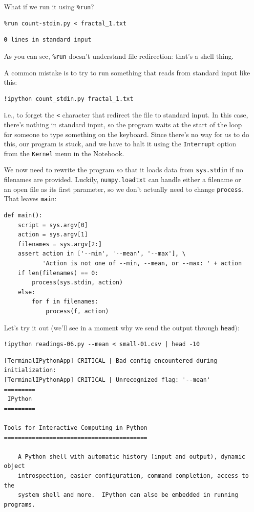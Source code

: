 \documentclass{book}
\begin{document}
What if we run it using \texttt{\%run}?

\begin{verbatim}
%run count-stdin.py < fractal_1.txt
\end{verbatim}

\begin{verbatim}
0 lines in standard input
\end{verbatim}

As you can see, \texttt{\%run} doesn't understand file redirection:
that's a shell thing.

A common mistake is to try to run something that reads from standard
input like this:

\begin{verbatim}
!ipython count_stdin.py fractal_1.txt
\end{verbatim}

i.e., to forget the \texttt{\textless{}} character that redirect the
file to standard input. In this case, there's nothing in standard input,
so the program waits at the start of the loop for someone to type
something on the keyboard. Since there's no way for us to do this, our
program is stuck, and we have to halt it using the \texttt{Interrupt}
option from the \texttt{Kernel} menu in the Notebook.

We now need to rewrite the program so that it loads data from
\texttt{sys.stdin} if no filenames are provided. Luckily,
\texttt{numpy.loadtxt} can handle either a filename or an open file as
its first parameter, so we don't actually need to change
\texttt{process}. That leaves \texttt{main}:

\begin{verbatim}
def main():
    script = sys.argv[0]
    action = sys.argv[1]
    filenames = sys.argv[2:]
    assert action in ['--min', '--mean', '--max'], \
           'Action is not one of --min, --mean, or --max: ' + action
    if len(filenames) == 0:
        process(sys.stdin, action)
    else:
        for f in filenames:
            process(f, action)
\end{verbatim}

Let's try it out (we'll see in a moment why we send the output through
\texttt{head}):

\begin{verbatim}
!ipython readings-06.py --mean < small-01.csv | head -10
\end{verbatim}

\begin{verbatim}
[TerminalIPythonApp] CRITICAL | Bad config encountered during initialization:
[TerminalIPythonApp] CRITICAL | Unrecognized flag: '--mean'
=========
 IPython
=========

Tools for Interactive Computing in Python
=========================================

    A Python shell with automatic history (input and output), dynamic object
    introspection, easier configuration, command completion, access to the
    system shell and more.  IPython can also be embedded in running programs.
\end{verbatim}
\end{document}
